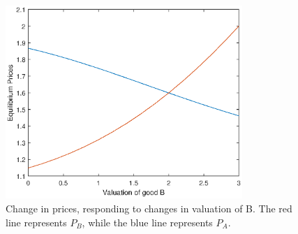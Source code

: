 \documentclass[12pt,a4paper]{article}
\begin{document}
\begin{enumerate}
\begin{figure}
\includegraphics[width=0.8\textwidth]{fig1.eps}
\caption{Change in prices, responding to changes in valuation of B. The red line represents $P_{B}$, while the blue line represents $P_{A}.$}
\end{figure}
\end{enumerate}
\end{document}
